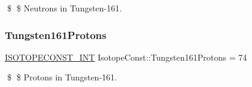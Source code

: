 \$ \$ Neutrons in Tungsten-\/161. \mbox{\label{group___isotope_const-_tungsten-_w161_ga1a1dd4bf42b481b0885a54a04e6d4ff2}} 
\subsubsection{\texorpdfstring{Tungsten161\+Protons}{Tungsten161Protons}}
{\footnotesize\ttfamily \mbox{\hyperlink{group___isotope_const-_macros_ga5f18360b3e99483a35c32d789e62621c}{I\+S\+O\+T\+O\+P\+E\+C\+O\+N\+S\+T\+\_\+\+I\+NT}} Isotope\+Const\+::\+Tungsten161\+Protons = 74}

\$ \$ Protons in Tungsten-\/161. 